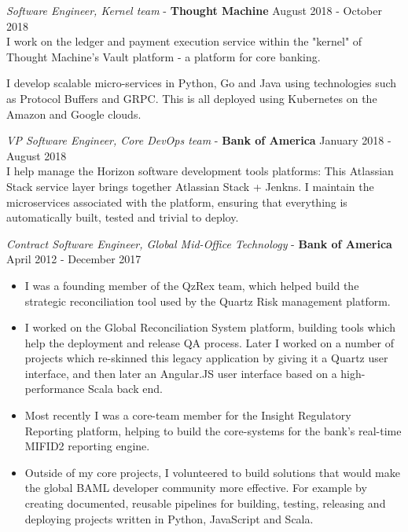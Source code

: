 \documentclass[margin, 10pt]{res} %
\begin{document}
\begin{resume}
        {\sl Software Engineer, Kernel team} - \textbf{Thought Machine} \hfill August 2018 - October 2018 \\

         I work on the ledger and payment execution service within the "kernel" of Thought Machine's Vault platform - a
         platform for core banking.

         I develop scalable micro-services in Python, Go and Java using technologies such as Protocol Buffers and GRPC.
         This is all deployed using Kubernetes on the Amazon and Google clouds.

        {\sl VP Software Engineer, Core DevOps team} - \textbf{Bank of America} \hfill January 2018 - August 2018 \\

        I help manage the Horizon software development tools platforms: This Atlassian Stack service layer
        brings together Atlassian Stack + Jenkns. I maintain the
        microservices associated with the platform, ensuring that everything is automatically built,
        tested and trivial to deploy.

        {\sl Contract Software Engineer, Global Mid-Office Technology} - \textbf{Bank of America} \hfill April 2012 - December 2017 \\

        \begin{itemize}
            \item I was a founding member of the QzRex team, which helped build the strategic reconciliation tool used by the Quartz Risk management platform.
            \item I worked on the Global Reconciliation System platform, building tools which help the deployment and release QA process. Later I worked on a number of projects which re-skinned this legacy application by giving it a Quartz user interface, and then later an Angular.JS user interface based on a high-performance Scala back end.
            \item Most recently I was a core-team member for the Insight Regulatory Reporting platform, helping to build the core-systems for the bank's real-time MIFID2 reporting engine.
            \item Outside of my core projects, I volunteered to build solutions that would make the global BAML developer community more effective. For example by creating documented, reusable pipelines for building, testing, releasing and deploying projects written in Python, JavaScript and Scala.
        \end{itemize}


\end{resume}
\end{document}
